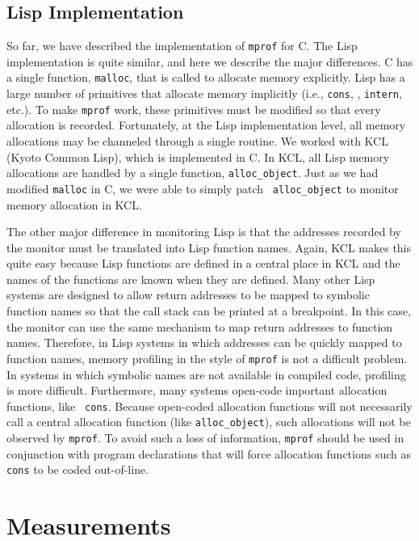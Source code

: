 \subsection{Lisp Implementation}

So far, we have described the implementation of {\tt mprof} for C.
The Lisp implementation is quite similar, and here we describe the
major differences.  C has a single function, {\tt malloc}, that is
called to allocate memory explicitly.  Lisp has a large number of
primitives that allocate memory implicitly (i.e., {\tt cons}, {\tt *},
{\tt intern}, etc.).  To make {\tt mprof} work, these primitives must
be modified so that every allocation is recorded.  Fortunately, at the
Lisp implementation level, all memory allocations may be channeled
through a single routine.  We worked with KCL (Kyoto Common Lisp),
which is implemented in C.  In KCL, all Lisp memory allocations are
handled by a single function, {\tt alloc\_object}.  Just as we had
modified {\tt malloc} in C, we were able to simply patch {\tt
alloc\_object} to monitor memory allocation in KCL.

The other major difference in monitoring Lisp is that the addresses
recorded by the monitor must be translated into Lisp function names.
Again, KCL makes this quite easy because Lisp functions are defined in
a central place in KCL and the names of the functions are known when
they are defined.  Many other Lisp systems are designed to allow
return addresses to be mapped to symbolic function names so that the
call stack can be printed at a breakpoint.  In this case, the monitor
can use the same mechanism to map return addresses to function names.
Therefore, in Lisp systems in which addresses can be quickly mapped to
function names, memory profiling in the style of {\tt mprof} is not a
difficult problem.  In systems in which symbolic names are not
available in compiled code, profiling is more difficult.  Furthermore,
many systems open-code important allocation functions, like {\tt
cons}.  Because open-coded allocation functions will not necessarily
call a central allocation function (like {\tt alloc\_object}), such
allocations will not be observed by {\tt mprof}.  To avoid such a loss
of information, {\tt mprof} should be used in conjunction with program
declarations that will force allocation functions such as {\tt cons}
to be coded out-of-line.

\section{Measurements}
\label{measurements}

